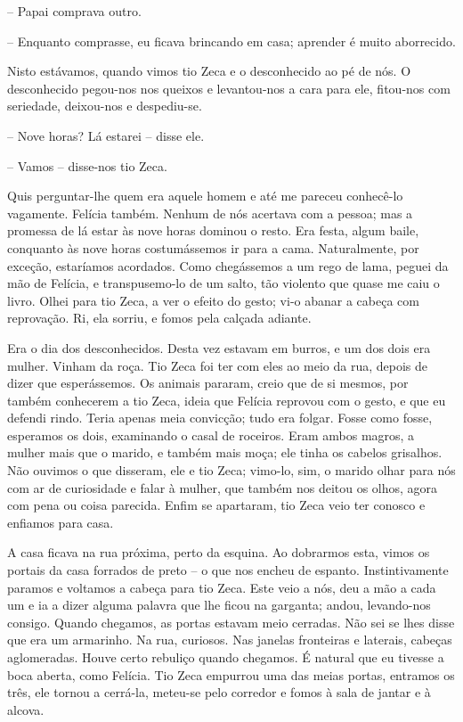 -- Papai comprava outro.

-- Enquanto comprasse, eu ficava brincando em casa; aprender é muito
aborrecido.

Nisto estávamos, quando vimos tio Zeca e o desconhecido ao pé de nós. O
desconhecido pegou-nos nos queixos e levantou-nos a cara para ele,
fitou-nos com seriedade, deixou-nos e despediu-se.

-- Nove horas? Lá estarei -- disse ele.

-- Vamos -- disse-nos tio Zeca.

Quis perguntar-lhe quem era aquele homem e até me pareceu conhecê-lo
vagamente. Felícia também. Nenhum de nós acertava com a pessoa; mas a
promessa de lá estar às nove horas dominou o resto. Era festa, algum
baile, conquanto às nove horas costumássemos ir para a cama.
Naturalmente, por exceção, estaríamos acordados. Como chegássemos a um
rego de lama, peguei da mão de Felícia, e transpusemo-lo de um salto,
tão violento que quase me caiu o livro. Olhei para tio Zeca, a ver o
efeito do gesto; vi-o abanar a cabeça com reprovação. Ri, ela sorriu, e
fomos pela calçada adiante.

Era o dia dos desconhecidos. Desta vez estavam em burros, e um dos dois
era mulher. Vinham da roça. Tio Zeca foi ter com eles ao meio da rua,
depois de dizer que esperássemos. Os animais pararam, creio que de si
mesmos, por também conhecerem a tio Zeca, ideia que Felícia reprovou com
o gesto, e que eu defendi rindo. Teria apenas meia convicção; tudo era
folgar. Fosse como fosse, esperamos os dois, examinando o casal de
roceiros. Eram ambos magros, a mulher mais que o marido, e também mais
moça; ele tinha os cabelos grisalhos. Não ouvimos o que disseram, ele e
tio Zeca; vimo-lo, sim, o marido olhar para nós com ar de curiosidade e
falar à mulher, que também nos deitou os olhos, agora com pena ou coisa
parecida. Enfim se apartaram, tio Zeca veio ter conosco e enfiamos para
casa.

A casa ficava na rua próxima, perto da esquina. Ao dobrarmos esta, vimos
os portais da casa forrados de preto -- o que nos encheu de espanto.
Instintivamente paramos e voltamos a cabeça para tio Zeca. Este veio a
nós, deu a mão a cada um e ia a dizer alguma palavra que lhe ficou na
garganta; andou, levando-nos consigo. Quando chegamos, as portas estavam
meio cerradas. Não sei se lhes disse que era um armarinho. Na rua,
curiosos. Nas janelas fronteiras e laterais, cabeças aglomeradas. Houve
certo rebuliço quando chegamos. É natural que eu tivesse a boca aberta,
como Felícia. Tio Zeca empurrou uma das meias portas, entramos os três,
ele tornou a cerrá-la, meteu-se pelo corredor e fomos à sala de jantar e
à alcova.

